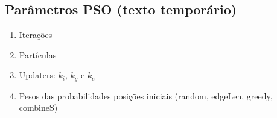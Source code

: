 \subsection{Parâmetros PSO (texto temporário)}

\begin{enumerate}[
    label = {\alph*)},
    ref = \thedefinition.\alph*,
    parsep = 0pt,
    itemsep = 0.2em,
    topsep = 0pt
]
    \item Iterações
    \item Partículas
    \item Updaters: $k_i$, $k_g$ e $k_e$
    \item Pesos das probabilidades posições iniciais (random, edgeLen, greedy, combineS)
\end{enumerate}

